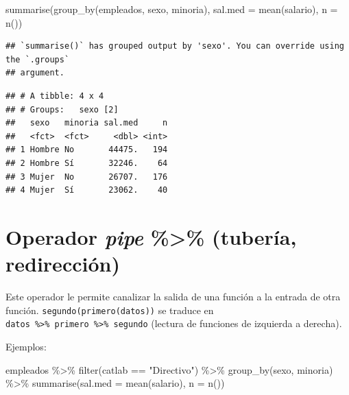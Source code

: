 \documentclass[
]{book}
\newenvironment{Shaded}{\begin{snugshade}}{\end{snugshade}}
\newcommand{\AttributeTok}[1]{\textcolor[rgb]{0.77,0.63,0.00}{#1}}
\newcommand{\FunctionTok}[1]{\textcolor[rgb]{0.00,0.00,0.00}{#1}}
\newcommand{\NormalTok}[1]{#1}
\newcommand{\SpecialCharTok}[1]{\textcolor[rgb]{0.00,0.00,0.00}{#1}}
\newcommand{\StringTok}[1]{\textcolor[rgb]{0.31,0.60,0.02}{#1}}
\theoremstyle{break}
\theoremstyle{nonumberplain}
\begin{document}
\begin{Shaded}
\begin{Highlighting}[]
\FunctionTok{summarise}\NormalTok{(}\FunctionTok{group\_by}\NormalTok{(empleados, sexo, minoria), }\AttributeTok{sal.med =} \FunctionTok{mean}\NormalTok{(salario), }\AttributeTok{n =} \FunctionTok{n}\NormalTok{())}
\end{Highlighting}
\end{Shaded}

\begin{verbatim}
## `summarise()` has grouped output by 'sexo'. You can override using the `.groups`
## argument.
\end{verbatim}

\begin{verbatim}
## # A tibble: 4 x 4
## # Groups:   sexo [2]
##   sexo   minoria sal.med     n
##   <fct>  <fct>     <dbl> <int>
## 1 Hombre No       44475.   194
## 2 Hombre Sí       32246.    64
## 3 Mujer  No       26707.   176
## 4 Mujer  Sí       23062.    40
\end{verbatim}

\hypertarget{dplyr-pipe}{%
\section{\texorpdfstring{Operador \emph{pipe} \textbf{\%\textgreater\%} (tubería, redirección)}{Operador pipe \%\textgreater\% (tubería, redirección)}}\label{dplyr-pipe}}

Este operador le permite canalizar la salida de una función a la entrada de otra función.
\texttt{segundo(primero(datos))} se traduce en \texttt{datos\ \%\textgreater{}\%\ primero\ \%\textgreater{}\%\ segundo}
(lectura de funciones de izquierda a derecha).

Ejemplos:

\begin{Shaded}
\begin{Highlighting}[]
\NormalTok{empleados }\SpecialCharTok{\%\textgreater{}\%}  \FunctionTok{filter}\NormalTok{(catlab }\SpecialCharTok{==} \StringTok{"Directivo"}\NormalTok{) }\SpecialCharTok{\%\textgreater{}\%}
          \FunctionTok{group\_by}\NormalTok{(sexo, minoria) }\SpecialCharTok{\%\textgreater{}\%}
          \FunctionTok{summarise}\NormalTok{(}\AttributeTok{sal.med =} \FunctionTok{mean}\NormalTok{(salario), }\AttributeTok{n =} \FunctionTok{n}\NormalTok{())}
\end{Highlighting}
\end{Shaded}
\end{document}
